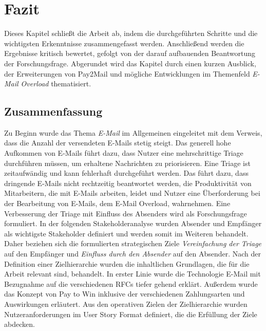 
\chapter{Fazit}
\label{Schluss}
Dieses Kapitel schließt die Arbeit ab, indem die durchgeführten Schritte und die wichtigsten Erkenntnisse zusammengefasst werden. Anschließend werden die Ergebnisse kritisch bewertet, gefolgt von der darauf aufbauenden Beantwortung der Forschungsfrage. Abgerundet wird das Kapitel durch einen kurzen Ausblick, der Erweiterungen von Pay2Mail und mögliche Entwicklungen im Themenfeld \textit{E-Mail Overload} thematisiert.

\section{Zusammenfassung}
\label{Zusammenfassung}
Zu Beginn wurde das Thema \textit{E-Mail} im Allgemeinen eingeleitet mit dem Verweis, dass die Anzahl der versendeten E-Mails stetig steigt. Das generell hohe Aufkommen von E-Mails führt dazu, dass Nutzer eine mehrschrittige Triage durchführen müssen, um erhaltene Nachrichten zu priorisieren. Eine Triage ist zeitaufwändig und kann fehlerhaft durchgeführt werden. Das führt dazu, dass dringende E-Mails nicht rechtzeitig beantwortet werden, die Produktivität von Mitarbeitern, die mit E-Mails arbeiten, leidet und Nutzer eine Überforderung bei der Bearbeitung von E-Mails, dem E-Mail Overload, wahrnehmen. Eine Verbesserung der Triage mit Einfluss des Absenders wird als Forschungsfrage formuliert. In der folgenden Stakeholderanalyse wurden Absender und Empfänger als wichtigste Stakeholder definiert und werden somit im Weiteren behandelt. Daher beziehen sich die formulierten strategischen Ziele \textit{Vereinfachung der Triage} auf den Empfänger und \textit{Einfluss durch den Absender} auf den Absender. Nach der Definition einer Zielhierarchie wurden die inhaltlichen Grundlagen, die für die Arbeit relevant sind, behandelt. In erster Linie wurde die Technologie E-Mail mit Bezugnahme auf die verschiedenen RFCs tiefer gehend erklärt. Außerdem wurde das Konzept von Pay to Win inklusive der verschiedenen Zahlungsarten und Auswirkungen erläutert. Aus den operativen Zielen der Zielhierarchie wurden Nutzeranforderungen im User Story Format definiert, die die Erfüllung der Ziele abdecken.

